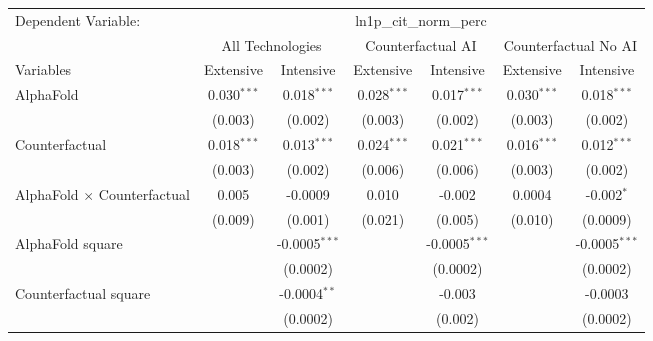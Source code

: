 \begingroup
\centering
\begin{tabular}{lcccccc}
   \tabularnewline \midrule \midrule
   Dependent Variable: & \multicolumn{6}{c}{ln1p\_cit\_norm\_perc}\\
 & \multicolumn{2}{c}{All Technologies} & \multicolumn{2}{c}{Counterfactual AI} & \multicolumn{2}{c}{Counterfactual No AI} \\
\cmidrule(lr){1-1}\cmidrule(lr){2-3} \cmidrule(lr){4-5} \cmidrule(lr){6-7}
Variables & \multicolumn{1}{c}{Extensive} & \multicolumn{1}{c}{Intensive} & \multicolumn{1}{c}{Extensive} & \multicolumn{1}{c}{Intensive} & \multicolumn{1}{c}{Extensive} & \multicolumn{1}{c}{Intensive} \\
\cmidrule(lr){1-1}\cmidrule(lr){2-2} \cmidrule(lr){3-3} \cmidrule(lr){4-4} \cmidrule(lr){5-5} \cmidrule(lr){6-6} \cmidrule(lr){7-7}
   AlphaFold                          & 0.030$^{***}$ & 0.018$^{***}$   & 0.028$^{***}$ & 0.017$^{***}$   & 0.030$^{***}$ & 0.018$^{***}$\\   
                                      & (0.003)       & (0.002)         & (0.003)       & (0.002)         & (0.003)       & (0.002)\\   
   Counterfactual                     & 0.018$^{***}$ & 0.013$^{***}$   & 0.024$^{***}$ & 0.021$^{***}$   & 0.016$^{***}$ & 0.012$^{***}$\\   
                                      & (0.003)       & (0.002)         & (0.006)       & (0.006)         & (0.003)       & (0.002)\\   
   AlphaFold $\times$ Counterfactual  & 0.005         & -0.0009         & 0.010         & -0.002          & 0.0004        & -0.002$^{*}$\\   
                                      & (0.009)       & (0.001)         & (0.021)       & (0.005)         & (0.010)       & (0.0009)\\   
   AlphaFold square                   &               & -0.0005$^{***}$ &               & -0.0005$^{***}$ &               & -0.0005$^{***}$\\   
                                      &               & (0.0002)        &               & (0.0002)        &               & (0.0002)\\   
   Counterfactual square              &               & -0.0004$^{**}$  &               & -0.003          &               & -0.0003\\   
                                      &               & (0.0002)        &               & (0.002)         &               & (0.0002)\\   

\end{tabular}
